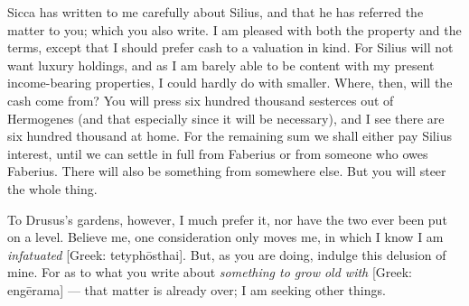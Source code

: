 

 Sicca has written to me carefully about Silius, and that he has referred the matter to you; which you also write. I am pleased with both the property and the terms, except that I should prefer cash to a valuation in kind. For Silius will not want luxury holdings, and as I am barely able to be content with my present income-bearing properties, I could hardly do with smaller. Where, then, will the cash come from? You will press six hundred thousand sesterces out of Hermogenes (and that especially since it will be necessary), and I see there are six hundred thousand at home. For the remaining sum we shall either pay Silius interest, until we can settle in full from Faberius or from someone who owes Faberius. There will also be something from somewhere else. But you will steer the whole thing.

 To Drusus's gardens, however, I much prefer it, nor have the two ever been put on a level. Believe me, one consideration only moves me, in which I know I am \textit{infatuated} [Greek: tetyphōsthai]. But, as you are doing, indulge this delusion of mine. For as to what you write about \textit{something to grow old with} [Greek: engērama] --- that matter is already over; I am seeking other things.
